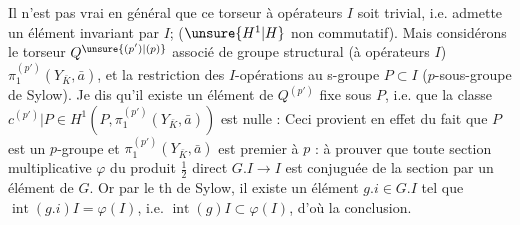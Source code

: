 Il n'est pas vrai en général que  ce torseur à opérateurs $I$ soit trivial, i.e. admette un élément invariant par $I$;
($\unsure{H^1|H}$ non commutatif). Mais considérons le  torseur $Q^{\unsure{(p')|(p)}}$ associé de groupe  structural (à opérateurs $I$) $\pi_1^{(p')}(Y_{\bar K},\bar a)$, et la restriction des $I$-opérations au s-groupe $P\subset I$ ($p$-sous-groupe de Sylow). Je dis qu'il existe un élément de $Q^{(p')}$ fixe sous $P$, i.e. que la classe $c^{(p')}|P\in H^1(P,\pi_1^{(p')}(Y_{\bar K},\bar a))$ est nulle : Ceci provient en effet du fait que $P$ est un $p$-groupe et  $\pi_1^{(p')}(Y_{\bar K},\bar a)$ est premier à $p$ : à prouver que  toute section multiplicative $\varphi$ du produit $\frac12$ direct $G.I\to I$ est conjuguée de la section  par un élément de $G$. Or par le th de  Sylow, il existe un élément $g.i\in G.I$ tel que $\operatorname{int}(g.i)I=\varphi(I)$, i.e. $\operatorname{int}(g)I\subset\varphi(I)$, d'où la conclusion.
